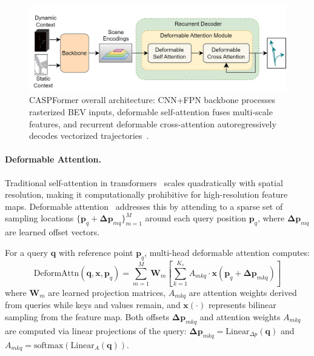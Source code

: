 \begin{description}[leftmargin=1em,itemsep=2pt]
\begin{figure}[ht]
  \centering
  \includegraphics[width=\linewidth]{figures/caspformer-overall-arch.jpg}
  \caption{CASPFormer overall architecture: CNN+FPN backbone processes rasterized BEV inputs, deformable self-attention fuses multi-scale features, and recurrent deformable cross-attention autoregressively decodes vectorized trajectories~\cite{caspformerYadav2024}.}
  \label{fig:caspformer_overall}
\end{figure}


\paragraph{Deformable Attention.} Traditional self-attention in transformers~\cite{vaswani2023attention} scales quadratically with spatial resolution, making it computationally prohibitive for high-resolution feature maps. Deformable attention~\cite{zhu2021deformabledetr} addresses this by attending to a sparse set of sampling locations \(\{\mathbf{p}_q + \boldsymbol{\Delta p}_{mq}\}_{m=1}^{M}\) around each query position \(\mathbf{p}_q\), where \(\boldsymbol{\Delta p}_{mq}\) are learned offset vectors.

For a query \(\mathbf{q}\) with reference point \(\mathbf{p}_q\), multi-head deformable attention computes:
\begin{equation}
  \label{eq:deformable_attention_general}
  \text{DeformAttn}(\mathbf{q}, \mathbf{x}, \mathbf{p}_q) = \sum_{m=1}^{M} \mathbf{W}_m \left[ \sum_{k=1}^{K_s} A_{mkq} \cdot \mathbf{x}(\mathbf{p}_q + \boldsymbol{\Delta p}_{mkq}) \right]
\end{equation}
where \(\mathbf{W}_m\) are learned projection matrices, \(A_{mkq}\) are attention weights derived from queries while keys and values remain, and \(\mathbf{x}(\cdot)\) represents bilinear sampling from the feature map. Both offsets \(\boldsymbol{\Delta p}_{mkq}\) and attention weights \(A_{mkq}\) are computed via linear projections of the query: \(\boldsymbol{\Delta p}_{mkq} = \text{Linear}_{\Delta p}(\mathbf{q})\) and \(A_{mkq} = \text{softmax}(\text{Linear}_{A}(\mathbf{q}))\).


\end{description}
